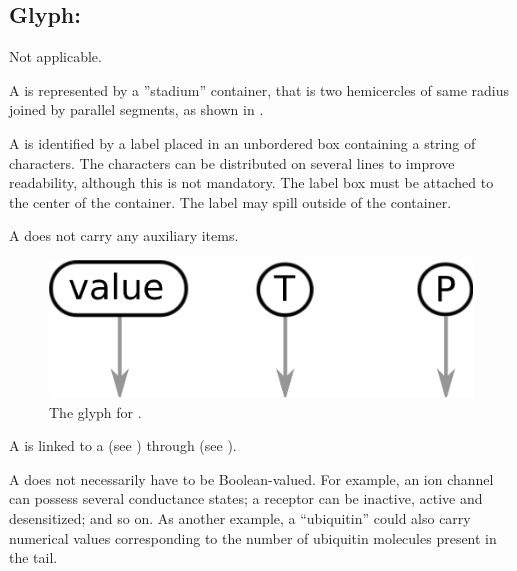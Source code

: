 
\subsection{Glyph: }
\label{sec:variableValue}

\begin{glyphDescription}
 
\glyphSboTerm Not applicable.
 
\glyphContainer A  is represented by a ''stadium'' container, that is two hemicercles of same radius joined by parallel segments, as shown in . 
 
\glyphLabel A  is identified by a label placed in an unbordered box containing a string of characters.  The characters can be distributed on several lines to improve readability, although this is not mandatory.  The label box must be attached to the center of the container.  The label may spill outside of the container.

\glyphAux A  does not carry any auxiliary items.  
 
\end{glyphDescription}
 
\begin{figure}[H]
   \centering
   \includegraphics[scale = 0.3]{images/variableValue}
   \caption{The \ER glyph for .}
   \label{fig:var-value}
\end{figure}

A  is linked to a  (see ) through  (see ). 

A  does not necessarily have to be Boolean-valued.  For example, an ion channel can possess several conductance states; a receptor can be inactive, active and desensitized; and so on.  As another example, a  ``ubiquitin'' could also carry numerical values corresponding to the number of ubiquitin molecules present in the tail.

